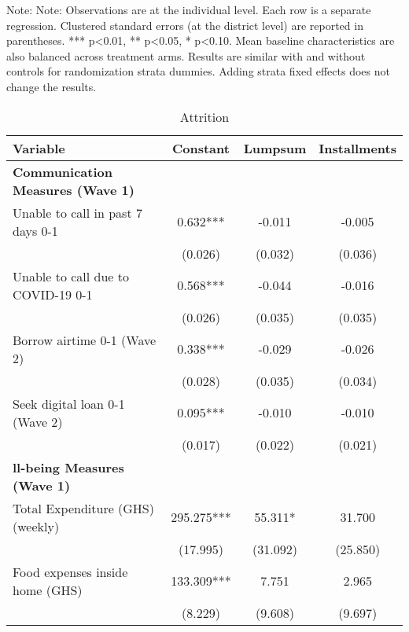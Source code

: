 \begin{ThreePartTable}
\begin{TableNotes}[flushleft]
\footnotesize
\item Note:                                  Note: Observations are at the individual level. Each row is a separate regression. Clustered standard errors (at the district level) are reported in parentheses. *** p<0.01, ** p<0.05, * p<0.10. Mean baseline characteristics are also balanced across treatment arms. Results are similar with and without controls for randomization strata dummies. Adding strata fixed effects does not change the results.                                 
\end{TableNotes}
\begin{table}[tbp]\centering
\def\sym#1{\ifmmode^{#1}\else\(^{#1}\)\fi}
\caption{Attrition}
\begin{tabular}{lccc}
\hline
 Variable & Constant & Lumpsum & Installments \\ [0.1em] 
\hline\hline
\textbf{Communication Measures (Wave 1)} & & & \\ 
 Unable to call in past 7 days 0-1 & 0.632*** & -0.011 & -0.005 \\ [0.1em] 
                   &      (0.026)     &      (0.032)     &      (0.036)     \\ [0.1em] 
 Unable to call due to COVID-19 0-1 & 0.568*** & -0.044 & -0.016 \\ [0.1em] 
                   &      (0.026)     &      (0.035)     &      (0.035)     \\ [0.1em] 
 Borrow airtime 0-1 (Wave 2) & 0.338*** & -0.029 & -0.026 \\ [0.1em] 
                   &      (0.028)     &      (0.035)     &      (0.034)     \\ [0.1em] 
 Seek digital loan 0-1 (Wave 2) & 0.095*** & -0.010 & -0.010 \\ [0.1em] 
                   &      (0.017)     &      (0.022)     &      (0.021)     \\ [0.1em] 
\textbf{ll-being Measures (Wave 1)} & & & \\ 
 Total Expenditure (GHS) (weekly) & 295.275*** & 55.311* & 31.700 \\ [0.1em] 
                   &      (17.995)     &      (31.092)     &      (25.850)     \\ [0.1em] 
 Food expenses inside home (GHS) & 133.309*** & 7.751 & 2.965 \\ [0.1em] 
                   &      (8.229)     &      (9.608)     &      (9.697)     \\ [0.1em] 

\end{tabular}
\end{table}
\end{ThreePartTable}
